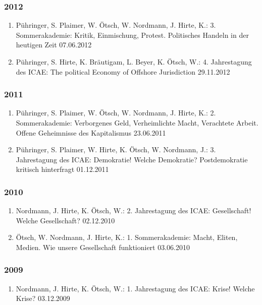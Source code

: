 \subsubsection*{2012}
\begin{enumerate}
	\item Pühringer, S. Plaimer, W. Ötsch, W. Nordmann, J. Hirte, K.: 3. Sommerakademie: Kritik, Einmischung, Protest. Politisches Handeln in der heutigen Zeit 07.06.2012
	\item Pühringer, S. Hirte, K. Bräutigam, L. Beyer, K. Ötsch, W.: 4. Jahrestagung des ICAE: The political Economy of Offshore Jurisdiction 29.11.2012
\end{enumerate}
\subsubsection*{2011}
\begin{enumerate}
	\item Pühringer, S. Plaimer, W. Ötsch, W. Nordmann, J. Hirte, K.: 2. Sommerakademie: Verborgenes Geld, Verheimlichte Macht, Verachtete Arbeit. Offene Geheimnisse des Kapitalismus 23.06.2011
	\item Pühringer, S. Plaimer, W. Hirte, K. Ötsch, W. Nordmann, J.: 3. Jahrestagung des ICAE: Demokratie! Welche Demokratie? Postdemokratie kritisch hinterfragt 01.12.2011
\end{enumerate}
\subsubsection*{2010}
\begin{enumerate}
	\item Nordmann, J. Hirte, K. Ötsch, W.: 2. Jahrestagung des ICAE: Gesellschaft! Welche Gesellschaft? 02.12.2010
	\item Ötsch, W. Nordmann, J. Hirte, K.: 1. Sommerakademie: Macht, Eliten, Medien. Wie unsere Gesellschaft funktioniert 03.06.2010
\end{enumerate}
\subsubsection*{2009}
\begin{enumerate}
	\item Nordmann, J. Hirte, K. Ötsch, W.: 1. Jahrestagung des ICAE: Krise! Welche Krise? 03.12.2009
\end{enumerate}

